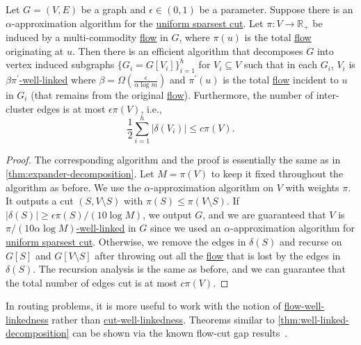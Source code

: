 \begin{theorem}\label{thm:well-linked-decomposition}
	Let \(G = (V, E)\) be a graph and \(\epsilon \in (0, 1)\) be a parameter. Suppose there is an \(\alpha \)-approximation algorithm for the \hyperref[prb:sparsest-cut]{uniform sparsest cut}. Let \(\pi \colon V \to \mathbb{R} _{+}\) be induced by a multi-commodity \hyperref[def:flow]{flow} in \(G\), where \(\pi (u)\) is the total \hyperref[def:flow]{flow} originating at \(u\). Then there is an efficient algorithm that decomposes \(G\) into vertex induced subgraphs \(\{ G_i = G[V_i] \} _{i=1}^{h}\) for \(V_i \subseteq V\) such that in each \(G_i\), \(V_i\) is \hyperref[def:weighted-well-linked]{\(\beta \pi ^{\prime} \)-well-linked} where \(\beta = \Omega (\frac{\epsilon }{\alpha \log m})\) and \(\pi ^{\prime} (u)\) is the total \hyperref[def:flow]{flow} incident to \(u\) in \(G_i\) (that remains from the original \hyperref[def:flow]{flow}). Furthermore, the number of inter-cluster edges is at most \(\epsilon \pi (V)\), i.e.,
	\[
		\frac{1}{2} \sum_{i=1}^{h} \lvert \delta (V_i) \rvert
		\leq c \pi (V).
	\]
\end{theorem}
\begin{proof}
	The corresponding algorithm and the proof is essentially the same as in \autoref{thm:expander-decomposition}. Let \(M = \pi (V)\) to keep it fixed throughout the algorithm as before. We use the \(\alpha \)-approximation algorithm on \(V\) with weights \(\pi \). It outputs a cut \((S, V\setminus S)\) with \(\pi (S) \leq \pi (V\setminus S)\). If \(\lvert \delta (S) \rvert \geq \epsilon \pi (S) / (10 \log M)\), we output \(G\), and we are guaranteed that \(V\) is \hyperref[def:weighted-well-linked]{\(\pi / (10 \alpha \log M)\)-well-linked} in \(G\) since we used an \(\alpha \)-approximation algorithm for \hyperref[prb:sparsest-cut]{uniform sparsest cut}. Otherwise, we remove the edges in \(\delta (S)\) and recurse on \(G[S]\) and \(G[V\setminus S]\) after throwing out all the \hyperref[def:flow]{flow} that is lost by the edges in \(\delta (S)\). The recursion analysis is the same as before, and we can guarantee that the total number of edges cut is at most \(c \pi (V)\).
\end{proof}

\begin{remark}
	In routing problems, it is more useful to work with the notion of \hyperref[def:flow-well-linked]{flow-well-linkedness} rather than \hyperref[def:cut-well-linked]{cut-well-linkedness}. Theorems similar to \autoref{thm:well-linked-decomposition} can be shown via the known flow-cut gap results~\cite{chekuri2005multicommodity}.
\end{remark}

